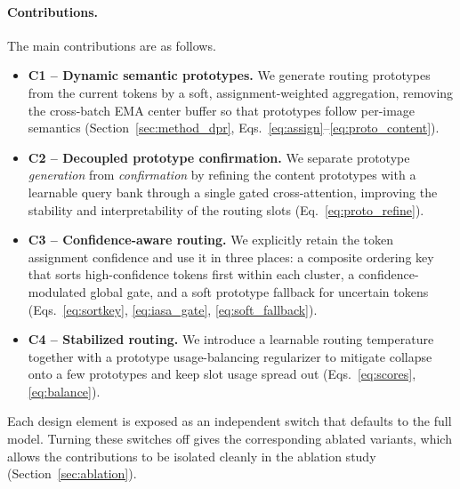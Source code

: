 \paragraph{Contributions.}
The main contributions are as follows.
\begin{itemize}
  \item \textbf{C1 -- Dynamic semantic prototypes.} We generate routing prototypes
  from the current tokens by a soft, assignment-weighted aggregation, removing the
  cross-batch EMA center buffer so that prototypes follow per-image semantics
  (Section~\ref{sec:method_dpr}, Eqs.~\eqref{eq:assign}--\eqref{eq:proto_content}).
  \item \textbf{C2 -- Decoupled prototype confirmation.} We separate prototype
  \emph{generation} from \emph{confirmation} by refining the content prototypes
  with a learnable query bank through a single gated cross-attention, improving the
  stability and interpretability of the routing slots
  (Eq.~\eqref{eq:proto_refine}).
  \item \textbf{C3 -- Confidence-aware routing.} We explicitly retain the token
  assignment confidence and use it in three places: a composite ordering key that
  sorts high-confidence tokens first within each cluster, a confidence-modulated
  global gate, and a soft prototype fallback for uncertain tokens
  (Eqs.~\eqref{eq:sortkey}, \eqref{eq:iasa_gate}, \eqref{eq:soft_fallback}).
  \item \textbf{C4 -- Stabilized routing.} We introduce a learnable routing
  temperature together with a prototype usage-balancing regularizer to mitigate
  collapse onto a few prototypes and keep slot usage spread out
  (Eqs.~\eqref{eq:scores}, \eqref{eq:balance}).
\end{itemize}
Each design element is exposed as an independent switch that defaults to the full
model. Turning these switches off gives the corresponding ablated variants, which
allows the contributions to be isolated cleanly in the ablation study
(Section~\ref{sec:ablation}).
